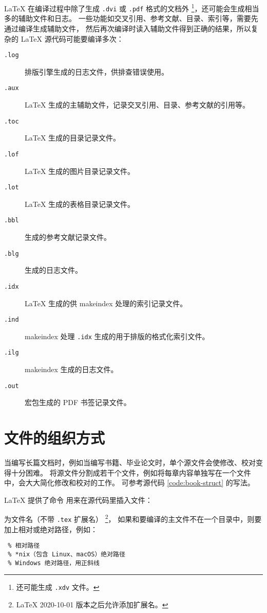 \LaTeX{} 在编译过程中除了生成 \texttt{.dvi} 或 \texttt{.pdf} 格式的文档外%
\footnote{ 还可能生成 \texttt{.xdv} 文件。}，还可能会生成相当多的辅助文件和日志。
一些功能如交叉引用、参考文献、目录、索引等，需要先通过编译生成辅助文件，
然后再次编译时读入辅助文件得到正确的结果，所以复杂的 \LaTeX{} 源代码可能要编译多次：
\begin{description}
  \item[\texttt{.log}] 排版引擎生成的日志文件，供排查错误使用。
  \item[\texttt{.aux}] \LaTeX{} 生成的主辅助文件，记录交叉引用、目录、参考文献的引用等。
  \item[\texttt{.toc}] \LaTeX{} 生成的目录记录文件。
  \item[\texttt{.lof}] \LaTeX{} 生成的图片目录记录文件。
  \item[\texttt{.lot}] \LaTeX{} 生成的表格目录记录文件。
  \item[\texttt{.bbl}]  生成的参考文献记录文件。
  \item[\texttt{.blg}]  生成的日志文件。
  \item[\texttt{.idx}] \LaTeX{} 生成的供 makeindex 处理的索引记录文件。
  \item[\texttt{.ind}] makeindex 处理 \texttt{.idx} 生成的用于排版的格式化索引文件。
  \item[\texttt{.ilg}] makeindex 生成的日志文件。
  \item[\texttt{.out}]  宏包生成的 PDF 书签记录文件。
\end{description}

\section{文件的组织方式}\label{sec:latex-multi-files}

当编写长篇文档时，例如当编写书籍、毕业论文时，单个源文件会使修改、校对变得十分困难。
将源文件分割成若干个文件，例如将每章内容单独写在一个文件中，会大大简化修改和校对的工作。
可参考源代码 \ref{code:book-struct} 的写法。

\LaTeX{} 提供了命令  用来在源代码里插入文件：
\begin{command}
\end{command}
 为文件名（不带 \texttt{.tex} 扩展名）%
\footnote{\LaTeX{} 2020-10-01 版本之后允许添加扩展名。}，
如果和要编译的主文件不在一个目录中，则要加上相对或绝对路径，例如：
\begin{verbatim}
 % 相对路径
 % *nix（包含 Linux、macOS）绝对路径
 % Windows 绝对路径，用正斜线
\end{verbatim}

